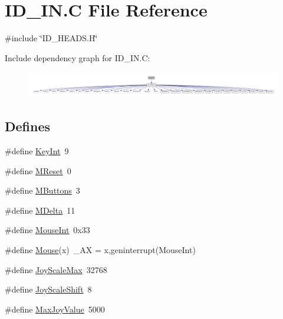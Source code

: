 \hypertarget{ID__IN_8C}{
\section{ID\_\-IN.C File Reference}
\label{ID__IN_8C}
}
{\ttfamily \#include \char`\"{}ID\_\-HEADS.H\char`\"{}}\par
Include dependency graph for ID\_\-IN.C:
\nopagebreak
\begin{figure}[H]
\begin{center}
\leavevmode
\includegraphics[width=400pt]{ID__IN_8C__incl}
\end{center}
\end{figure}
\subsection*{Defines}
\begin{DoxyCompactItemize}
\item 
\#define \hyperlink{ID__IN_8C_ac250ed4d7e19a3f136c6431fc281b6b9}{KeyInt}~9
\item 
\#define \hyperlink{ID__IN_8C_a57b4d6b42abb5abac156b4e28a5fcfdf}{MReset}~0
\item 
\#define \hyperlink{ID__IN_8C_ab05e3da4f514a6b22b5752a361169045}{MButtons}~3
\item 
\#define \hyperlink{ID__IN_8C_a1795ad7e960197e84346c3cb2e33614b}{MDelta}~11
\item 
\#define \hyperlink{ID__IN_8C_a527075b2ecdd528854c72a142e60c2d8}{MouseInt}~0x33
\item 
\#define \hyperlink{ID__IN_8C_a8b9b10ab48f8d5b6f3e6e083e5e524a7}{Mouse}(x)~\_\-AX = x,geninterrupt(MouseInt)
\item 
\#define \hyperlink{ID__IN_8C_ab56158b7f46e787501836a0a818f5c1d}{JoyScaleMax}~32768
\item 
\#define \hyperlink{ID__IN_8C_aef1c776ac5314f1c9ef1cfc315bb1c31}{JoyScaleShift}~8
\item 
\#define \hyperlink{ID__IN_8C_a444f89dca4b40f43f6bc21b7cc4e4905}{MaxJoyValue}~5000
\end{DoxyCompactItemize}
